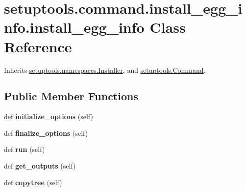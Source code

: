 \hypertarget{classsetuptools_1_1command_1_1install__egg__info_1_1install__egg__info}{}\section{setuptools.\+command.\+install\+\_\+egg\+\_\+info.\+install\+\_\+egg\+\_\+info Class Reference}
\label{classsetuptools_1_1command_1_1install__egg__info_1_1install__egg__info}


Inherits \hyperlink{classsetuptools_1_1namespaces_1_1_installer}{setuptools.\+namespaces.\+Installer}, and \hyperlink{classsetuptools_1_1_command}{setuptools.\+Command}.

\subsection*{Public Member Functions}
\begin{DoxyCompactItemize}
\item 
\mbox{\label{classsetuptools_1_1command_1_1install__egg__info_1_1install__egg__info_a5ab5aa08ad756bca1e88696028a02193}} 
def {\bfseries initialize\+\_\+options} (self)
\item 
\mbox{\label{classsetuptools_1_1command_1_1install__egg__info_1_1install__egg__info_a09bf3e11da2fca8e1d598f5bfef28c6e}} 
def {\bfseries finalize\+\_\+options} (self)
\item 
\mbox{\label{classsetuptools_1_1command_1_1install__egg__info_1_1install__egg__info_ab796e0cd113ca97b504d05f167ef3ea3}} 
def {\bfseries run} (self)
\item 
\mbox{\label{classsetuptools_1_1command_1_1install__egg__info_1_1install__egg__info_a10f0717594f638c0e32504bb45968eb2}} 
def {\bfseries get\+\_\+outputs} (self)
\item 
\mbox{\label{classsetuptools_1_1command_1_1install__egg__info_1_1install__egg__info_afb27066e412852b61f7d909f61512a15}} 
def {\bfseries copytree} (self)
\end{DoxyCompactItemize}
